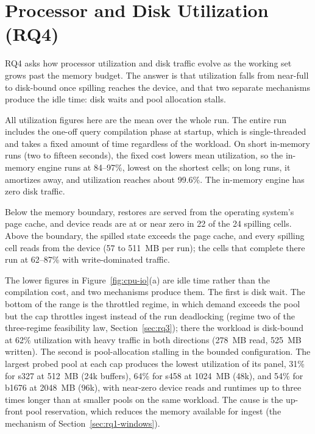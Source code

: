 \section{Processor and Disk Utilization (RQ4)\label{sec:rq4}}

RQ4 asks how processor utilization and disk traffic evolve as the working set grows past the memory budget.
The answer is that utilization falls from near-full to disk-bound once spilling reaches the device, and that two separate mechanisms produce the idle time: disk waits and pool allocation stalls.

All utilization figures here are the mean over the whole run.
The entire run includes the one-off query compilation phase at startup, which is single-threaded and takes a fixed amount of time regardless of the workload.
On short in-memory runs (two to fifteen seconds), the fixed cost lowers mean utilization, so the in-memory engine runs at 84--97\%, lowest on the shortest cells; on long runs, it amortizes away, and utilization reaches about 99.6\%.
The in-memory engine has zero disk traffic.

Below the memory boundary, restores are served from the operating system's page cache, and device reads are at or near zero in 22 of the 24 spilling cells.
Above the boundary, the spilled state exceeds the page cache, and every spilling cell reads from the device (57 to 511\, MB per run); the cells that complete there run at 62--87\% with write-dominated traffic.

The lower figures in Figure~\ref{fig:cpu-io}(a) are idle time rather than the compilation cost, and two mechanisms produce them.
The first is disk wait.
The bottom of the range is the throttled regime, in which demand exceeds the pool but the cap throttles ingest instead of the run deadlocking (regime two of the three-regime feasibility law, Section~\ref{sec:rq3}); there the workload is disk-bound at 62\% utilization with heavy traffic in both directions (278\, MB read, 525\, MB written).
The second is pool-allocation stalling in the bounded configuration.
The largest probed pool at each cap produces the lowest utilization of its panel, 31\% for s327 at 512\, MB (24k buffers), 64\% for s458 at 1024\, MB (48k), and 54\% for b1676 at 2048\, MB (96k), with near-zero device reads and runtimes up to three times longer than at smaller pools on the same workload.
The cause is the up-front pool reservation, which reduces the memory available for ingest (the mechanism of Section~\ref{sec:rq1-windows}).

